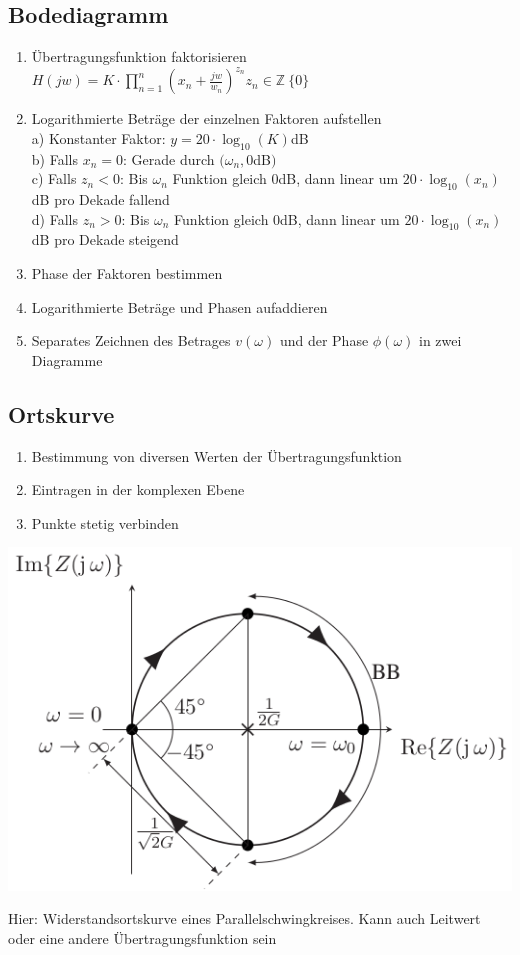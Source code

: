 \documentclass[fs, footer]{latex4ei}
\begin{document}
\begin{multicols*}{4}
\subsection{Bodediagramm}
\begin{enumerate}
	\item Übertragungsfunktion faktorisieren\\
		$H(jw) = K \cdot \prod_{n=1}^n \left(x_n+\frac{jw}{w_n}\right)^{z_n}$\qquad$z_n \in \mathbb{Z} \ \{0\}$\\
	\item Logarithmierte Beträge der einzelnen Faktoren aufstellen\\
		\quad a) Konstanter Faktor: $y = 20\cdot\log_{10}(K)$dB\\
		\quad b) Falls $x_n = 0$: Gerade durch $(\omega_n, 0$dB$)$\\
		\quad c) Falls $z_n < 0$: Bis $\omega_n$ Funktion gleich 0dB, dann linear um $20 \cdot\log_{10}(x_n)$dB pro Dekade fallend\\
		\quad d) Falls $z_n > 0$: Bis $\omega_n$ Funktion gleich 0dB, dann linear um $20 \cdot\log_{10}(x_n)$dB pro Dekade steigend\\
	\item Phase der Faktoren bestimmen
	\item Logarithmierte Beträge und Phasen aufaddieren
	\item Separates Zeichnen des Betrages $v(\omega)$ und der Phase $\phi(\omega)$ in zwei Diagramme
\end{enumerate}
\subsection{Ortskurve}
\begin{enumerate}
	\item Bestimmung von diversen Werten der Übertragungsfunktion
	\item Eintragen in der komplexen Ebene
	\item Punkte stetig verbinden
\end{enumerate}
\parbox{.6\linewidth}{
\includegraphics[width=\linewidth]{img/ortskurve-r}}
\parbox{.4\linewidth}{
Hier: Widerstandsortskurve eines Parallelschwingkreises. Kann auch Leitwert oder eine andere Übertragungsfunktion sein}

\end{multicols*}
\end{document}
